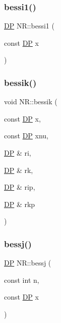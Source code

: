 \mbox{\label{namespaceNR_a70a172f14124c10b796af212fdb125ec}} 
\subsubsection{\texorpdfstring{bessi1()}{bessi1()}}
{\footnotesize\ttfamily \mbox{\hyperlink{namespaceNR_af6ff762dd605ff477b8e52387253a02a}{DP}} N\+R\+::bessi1 (\begin{DoxyParamCaption}\item[{const \mbox{\hyperlink{namespaceNR_af6ff762dd605ff477b8e52387253a02a}{DP}}}]{x }\end{DoxyParamCaption})}

\mbox{\label{namespaceNR_ac11d8c1819aee8d97aa4bdf944534212}} 
\subsubsection{\texorpdfstring{bessik()}{bessik()}}
{\footnotesize\ttfamily void N\+R\+::bessik (\begin{DoxyParamCaption}\item[{const \mbox{\hyperlink{namespaceNR_af6ff762dd605ff477b8e52387253a02a}{DP}}}]{x,  }\item[{const \mbox{\hyperlink{namespaceNR_af6ff762dd605ff477b8e52387253a02a}{DP}}}]{xnu,  }\item[{\mbox{\hyperlink{namespaceNR_af6ff762dd605ff477b8e52387253a02a}{DP}} \&}]{ri,  }\item[{\mbox{\hyperlink{namespaceNR_af6ff762dd605ff477b8e52387253a02a}{DP}} \&}]{rk,  }\item[{\mbox{\hyperlink{namespaceNR_af6ff762dd605ff477b8e52387253a02a}{DP}} \&}]{rip,  }\item[{\mbox{\hyperlink{namespaceNR_af6ff762dd605ff477b8e52387253a02a}{DP}} \&}]{rkp }\end{DoxyParamCaption})}

\mbox{\label{namespaceNR_a92c1165db5f7c1972279d98ef34037d0}} 
\subsubsection{\texorpdfstring{bessj()}{bessj()}}
{\footnotesize\ttfamily \mbox{\hyperlink{namespaceNR_af6ff762dd605ff477b8e52387253a02a}{DP}} N\+R\+::bessj (\begin{DoxyParamCaption}\item[{const int}]{n,  }\item[{const \mbox{\hyperlink{namespaceNR_af6ff762dd605ff477b8e52387253a02a}{DP}}}]{x }\end{DoxyParamCaption})}

